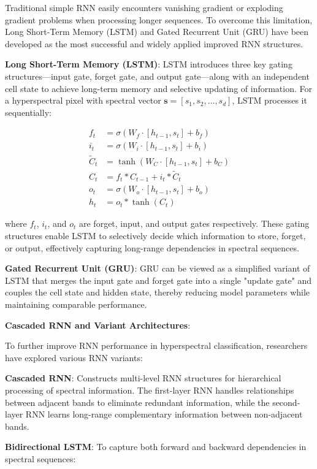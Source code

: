 \documentclass[journal]{IEEEtran}
\begin{document}
Traditional simple RNN easily encounters vanishing gradient or exploding gradient problems when processing longer sequences. To overcome this limitation, Long Short-Term Memory (LSTM) and Gated Recurrent Unit (GRU) have been developed as the most successful and widely applied improved RNN structures.

\textbf{Long Short-Term Memory (LSTM)}: LSTM introduces three key gating structures—input gate, forget gate, and output gate—along with an independent cell state to achieve long-term memory and selective updating of information. For a hyperspectral pixel with spectral vector $\mathbf{s} = [s_1, s_2, \ldots, s_d]$, LSTM processes it sequentially:

\begin{align}
f_t &= \sigma(W_f \cdot [h_{t-1}, s_t] + b_f) \\
i_t &= \sigma(W_i \cdot [h_{t-1}, s_t] + b_i) \\
\tilde{C}_t &= \tanh(W_C \cdot [h_{t-1}, s_t] + b_C) \\
C_t &= f_t * C_{t-1} + i_t * \tilde{C}_t \\
o_t &= \sigma(W_o \cdot [h_{t-1}, s_t] + b_o) \\
h_t &= o_t * \tanh(C_t)
\end{align}

where $f_t$, $i_t$, and $o_t$ are forget, input, and output gates respectively. These gating structures enable LSTM to selectively decide which information to store, forget, or output, effectively capturing long-range dependencies in spectral sequences.

\textbf{Gated Recurrent Unit (GRU)}: GRU can be viewed as a simplified variant of LSTM that merges the input gate and forget gate into a single "update gate" and couples the cell state and hidden state, thereby reducing model parameters while maintaining comparable performance.

\textbf{Cascaded RNN and Variant Architectures}:

To further improve RNN performance in hyperspectral classification, researchers have explored various RNN variants:

\textbf{Cascaded RNN}: Constructs multi-level RNN structures for hierarchical processing of spectral information. The first-layer RNN handles relationships between adjacent bands to eliminate redundant information, while the second-layer RNN learns long-range complementary information between non-adjacent bands.

\textbf{Bidirectional LSTM}: To capture both forward and backward dependencies in spectral sequences:
\end{document}
